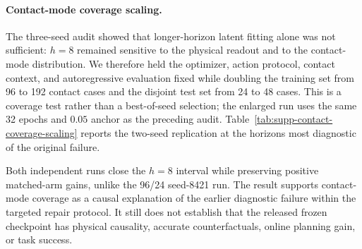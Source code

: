 \documentclass{article}
\begin{document}
\paragraph{Contact-mode coverage scaling.}
The three-seed audit showed that longer-horizon latent fitting alone was not
sufficient: $h=8$ remained sensitive to the physical readout and to the
contact-mode distribution. We therefore held the optimizer, action protocol,
contact context, and autoregressive evaluation fixed while doubling the
training set from 96 to 192 contact cases and the disjoint test set from 24
to 48 cases. This is a coverage test rather than a best-of-seed selection;
the enlarged run uses the same 32 epochs and $0.05$ anchor as the preceding
audit. Table~\ref{tab:supp-contact-coverage-scaling} reports the two-seed
replication at the horizons most diagnostic of the original failure.

\begin{table}[H]
\centering
\scriptsize
\setlength{\tabcolsep}{3pt}
\caption{Contact-mode coverage scaling under the 192/48 protocol. Errors are
$+a$ block-XY pixels; gains are base error minus repaired-calibrated error.
Intervals are episode-bootstrap 95\% intervals over 48 held-out contact
cases. The $-a$ and zero columns are matched-arm point gains.}
\label{tab:supp-contact-coverage-scaling}
\end{table}

Both independent runs close the $h=8$ interval while preserving positive
matched-arm gains, unlike the 96/24 seed-8421 run. The result supports
contact-mode coverage as a causal explanation of the earlier diagnostic
failure within the targeted repair protocol. It still does not establish that
the released frozen checkpoint has physical causality, accurate
counterfactuals, online planning gain, or task success.
\end{document}
